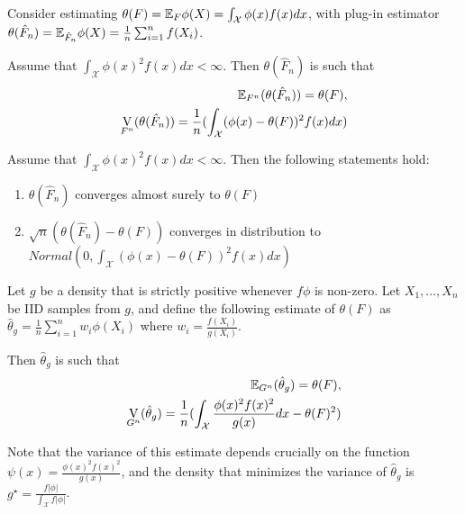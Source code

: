 \begin{thm}
  \label{sec:monte-carlo-method-2}
  Consider estimating $\theta(F) = \E_{F} \phi(X) =
  \int_{\mathcal{X}}^{} \phi(x) f(x) dx$, with plug-in estimator
  $\theta(\hat F_{n}) = \E_{\hat F_{n}} \phi(X) = \frac{1}{n}
  \sum_{i=1}^{n} f(X_{i})$.

  Assume that $\int_{\mathcal{X}} \phi(x)^{2} f(x) dx < \infty$.  Then
  $\theta(\hat F_{n})$ is such that
  \begin{align}
    \label{eq:1}
    \E_{F^{n}}(\theta(\hat F_{n})) = \theta(F), \\
    \label{eq:2}
    \V_{F^{n}}(\theta(\hat F_{n})) = \frac{1}{n} (\int_{\mathcal{X}}
    (\phi(x) - \theta(F))^{2} f(x) dx)
  \end{align}
\end{thm}

\begin{thm}
  \label{sec:monte-carlo-method-3}
  Assume that $\int_{\mathcal{X}} \phi(x)^{2} f(x) dx < \infty$.  Then
  the following statements hold:
  \begin{enumerate}
  \item $\theta(\hat F_{n})$ converges almost surely to $\theta(F)$
  \item $\sqrt{n} (\theta(\hat F_{n}) - \theta(F))$ converges in
    distribution to $Normal(0, \int_{\mathcal{X}} (\phi(x) -
    \theta(F))^{2} f(x) dx)$
  \end{enumerate}
\end{thm}

\begin{thm}
  \label{sec:monte-carlo-method-4}
  Let $g$ be a density that is strictly positive whenever $f \phi$ is
  non-zero.  Let $X_{1}, \dots, X_{n}$ be IID samples from $g$, and
  define the following estimate of  $\theta(F)$ as $\hat \theta_{g} =
  \frac{1}{n} \sum_{i=1}^{n} w_{i} \phi(X_{i})$ where $w_{i} =
  \frac{f(X_{i})}{g(X_{i})}$.

  Then $\hat \theta_{g}$ is such that
  \begin{align}
    \label{eq:3}
    \E_{G^{n}}(\hat \theta_{g}) = \theta(F), \\
    \label{eq:4}
    \V_{G^{n}}(\hat \theta_{g}) = \frac{1}{n} (\int_{\mathcal{X}}
    \frac{\phi(x)^{2} f(x)^{2}}{g(x)} dx - \theta(F)^{2})
  \end{align}
\end{thm}

\begin{thm}
  \label{sec:monte-carlo-method-5}
  Note that the variance of this estimate depends crucially on the
  function $\psi(x) = \frac{\phi(x)^{2} f(x)^{2}}{g(x)}$, and the
  density that minimizes the variance of $\hat \theta_{g}$ is
  $g^{\star} = \frac{f |\phi|}{\int_{\mathcal{X}} f |\phi|}$.
\end{thm}

